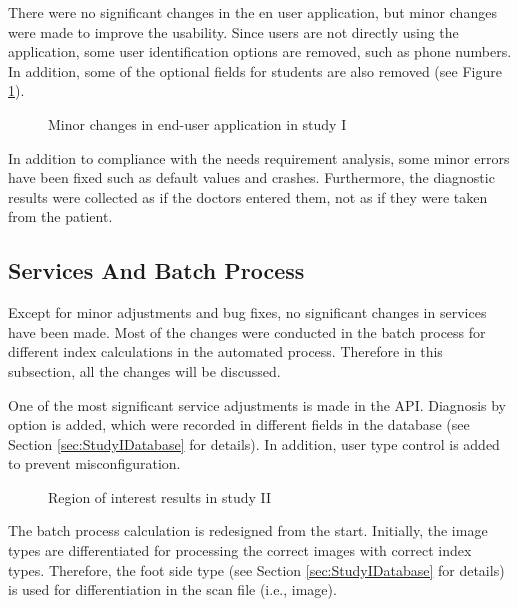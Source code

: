 There were no significant changes in the en user application, but minor changes were made to improve the usability. Since users are not directly using the application, some user identification options are removed, such as phone numbers. In addition, some of the optional fields for students are also removed (see Figure \ref{fig:UserApplicationStudyIChanges}).

\begin{figure}[htbp]
\centering
{}
\caption{Minor changes in end-user application in study I}
\label{fig:UserApplicationStudyIChanges}
\end{figure}

In addition to compliance with the needs requirement analysis, some minor errors have been fixed such as default values and crashes. Furthermore, the diagnostic results were collected as if the doctors entered them, not as if they were taken from the patient.

\subsection{Services And Batch Process}

Except for minor adjustments and bug fixes, no significant changes in services have been made. Most of the changes were conducted in the batch process for different index calculations in the automated process. Therefore in this subsection, all the changes will be discussed. 

One of the most significant service adjustments is made in the API. Diagnosis by option is added, which were recorded in different fields in the database (see Section \ref{sec:StudyIDatabase} for details). In addition, user type control is added to prevent misconfiguration.

\begin{figure}[htbp]
\centering
{}
\caption{Region of interest results in study II}
\label{fig:BatchProcessRioStudyII}
\end{figure}

The batch process calculation is redesigned from the start. Initially, the image types are differentiated for processing the correct images with correct index types. Therefore, the foot side type (see Section \ref{sec:StudyIDatabase} for details) is used for differentiation in the scan file (i.e., image).

